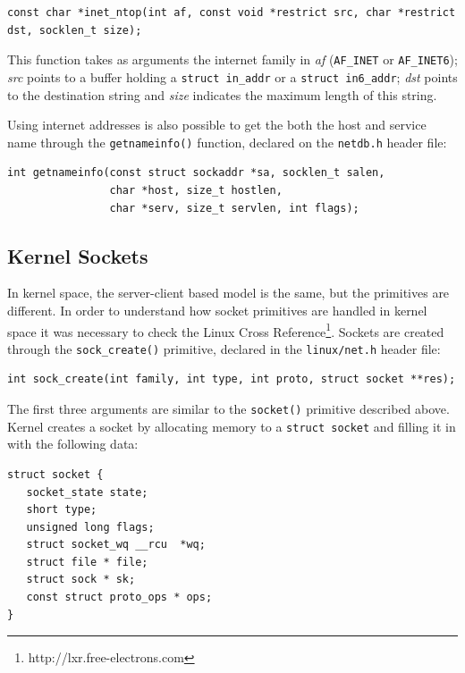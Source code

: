 \begin{lstlisting}[caption=Declaration of the \texttt{inet\_ntop()} function]
const char *inet_ntop(int af, const void *restrict src, char *restrict dst, socklen_t size);
\end{lstlisting}

This function takes as arguments the internet family in \textit{af} (\texttt{AF\_INET} or \texttt{AF\_INET6}); \textit{src} points to a buffer holding a \texttt{struct in\_addr} or a \texttt{struct in6\_addr}; \textit{dst} points to the destination string and \textit{size} indicates the maximum length of this string.

Using internet addresses is also possible to get the both the host and service name through the \texttt{getnameinfo()} function, declared on the \texttt{netdb.h} header file:

\begin{lstlisting}[caption=Declaration of the \texttt{getnameinfo()} function]
int getnameinfo(const struct sockaddr *sa, socklen_t salen,
                char *host, size_t hostlen,
                char *serv, size_t servlen, int flags);
\end{lstlisting}


\subsection{Kernel Sockets}

In kernel space, the server-client based model is the same, but the primitives are different. In order to understand how socket primitives are handled in kernel space it was necessary to check the Linux Cross Reference\footnote{http://lxr.free-electrons.com}. Sockets are created through the \texttt{sock\_create()} primitive, declared in the \texttt{linux/net.h} header file:

\begin{lstlisting}[caption=Declaration of the \texttt{sock\_create()} function]
int sock_create(int family, int type, int proto, struct socket **res);
\end{lstlisting}

The first three arguments are similar to the \texttt{socket()} primitive described above. Kernel creates a socket by allocating memory to a \texttt{struct socket} and filling it in with the following data:

\begin{lstlisting}[caption=Declaration of the \texttt{socket} structure]
struct socket {
   socket_state state;
   short type;
   unsigned long flags;
   struct socket_wq __rcu  *wq;
   struct file * file;
   struct sock * sk;
   const struct proto_ops * ops;
}
\end{lstlisting}

